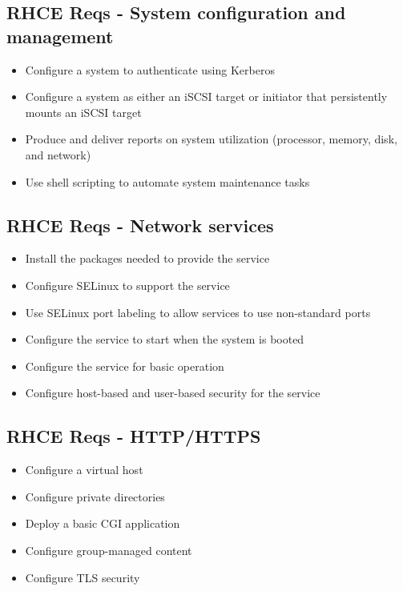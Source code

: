 \documentclass[letterpaper,10pt,english]{sphinxmanual}
\begin{document}
\subsection{RHCE Reqs - System configuration and management}
\label{intro:id2}\begin{itemize}
\item {} 
Configure a system to authenticate using Kerberos

\item {} 
Configure a system as either an iSCSI target or initiator that persistently mounts an iSCSI target

\item {} 
Produce and deliver reports on system utilization (processor, memory, disk, and network)

\item {} 
Use shell scripting to automate system maintenance tasks

\end{itemize}


\subsection{RHCE Reqs - Network services}
\label{intro:rhce-reqs-network-services}\begin{itemize}
\item {} 
Install the packages needed to provide the service

\item {} 
Configure SELinux to support the service

\item {} 
Use SELinux port labeling to allow services to use non-standard ports

\item {} 
Configure the service to start when the system is booted

\item {} 
Configure the service for basic operation

\item {} 
Configure host-based and user-based security for the service

\end{itemize}


\subsection{RHCE Reqs - HTTP/HTTPS}
\label{intro:rhce-reqs-http-https}\begin{itemize}
\item {} 
Configure a virtual host

\item {} 
Configure private directories

\item {} 
Deploy a basic CGI application

\item {} 
Configure group-managed content

\item {} 
Configure TLS security

\end{itemize}
\end{document}
